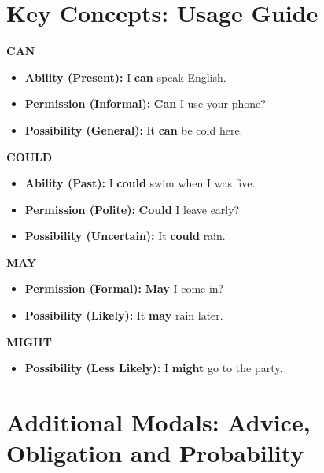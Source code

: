 \section{Key Concepts: Usage Guide}

\begin{vocabbox}[title=Can vs. Could]
\textbf{CAN}
\begin{itemize}
    \item \textbf{Ability (Present):} I \textbf{can} speak English. 
    \item \textbf{Permission (Informal):} \textbf{Can} I use your phone? 
    \item \textbf{Possibility (General):} It \textbf{can} be cold here. 
\end{itemize}

\textbf{COULD}
\begin{itemize}
    \item \textbf{Ability (Past):} I \textbf{could} swim when I was five. 
    \item \textbf{Permission (Polite):} \textbf{Could} I leave early? 
    \item \textbf{Possibility (Uncertain):} It \textbf{could} rain. 
\end{itemize}
\end{vocabbox}

\begin{vocabbox}[title=May vs. Might]
\textbf{MAY}
\begin{itemize}
    \item \textbf{Permission (Formal):} \textbf{May} I come in? 
    \item \textbf{Possibility (Likely):} It \textbf{may} rain later. 
\end{itemize}

\textbf{MIGHT}
\begin{itemize}
    \item \textbf{Possibility (Less Likely):} I \textbf{might} go to the party. 
\end{itemize}
\end{vocabbox}

\section{Additional Modals: Advice, Obligation and Probability}

